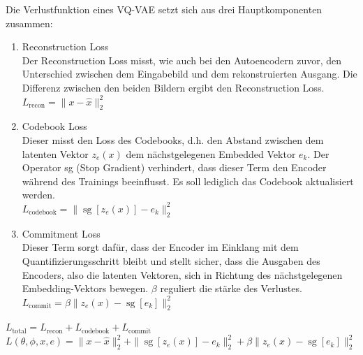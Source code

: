 \newpage
            \cite{vqvae} Die Verlustfunktion eines VQ-VAE setzt sich aus drei Hauptkomponenten zusammen:
            \begin{enumerate}
                \item Reconstruction Loss\\
                    Der Reconstruction Loss misst, wie auch bei den Autoencodern zuvor, den Unterschied zwischen dem Eingabebild und dem rekonstruierten Ausgang. Die Differenz zwischen den beiden Bildern ergibt den Reconstruction Loss.\\
                    $L_{\text{recon}} = \| x - \hat{x} \|_2^2$
                \item Codebook Loss\\
                    Dieser misst den Loss des Codebooks, d.h. den Abstand zwischen dem latenten Vektor
                    $z_e(x)$ dem nächstgelegenen Embedded Vektor $e_k$. Der Operator sg (Stop Gradient) verhindert, dass dieser Term den Encoder während des Trainings beeinflusst. Es soll lediglich das Codebook aktualisiert werden.\\
                    $L_{\text{codebook}} = \| \operatorname{sg}[z_e(x)] - e_k \|_2^2$\\
                \item Commitment Loss\\
                    Dieser Term sorgt dafür, dass der Encoder im Einklang mit dem Quantifizierungsschritt bleibt und stellt sicher, dass die Ausgaben des Encoders, also die latenten Vektoren, sich in Richtung des nächstgelegenen Embedding-Vektors bewegen. $\beta$ reguliert die stärke des Verlustes.\\
                    $L_{\text{commit}} = \beta \| z_e(x) - \operatorname{sg}[e_k] \|_2^2$\\
            \end{enumerate}
            \begin{center}
                $L_{\text{total}} = L_{\text{recon}} + L_{\text{codebook}} + L_{\text{commit}}$\\
                $L(\theta, \phi, x, e) = \| x - \hat{x} \|_2^2 + \| \operatorname{sg}[z_e(x)] - e_k \|_2^2 + \beta \| z_e(x) - \operatorname{sg}[e_k] \|_2^2$
            \end{center} 
